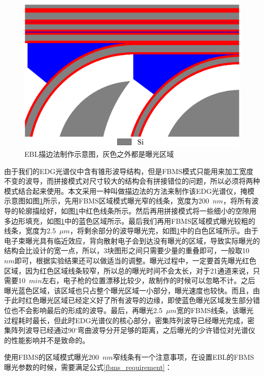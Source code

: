 \begin{figure}[htb]
	\centering
	\includegraphics[width=14cm]{./Pictures/edg_miaobian.jpg}
	\captionsetup{justification=centering}
	\caption{EBL描边法制作示意图，灰色之外都是曝光区域}
	\label{edg_miaobian}
\end{figure}

由于我们的EDG光谱仪中含有锥形波导结构，但是FBMS模式只能用来加工宽度不变的波导，而拼接模式对尺寸较大的结构会有拼接错位的问题，所以必须将两种模式结合起来使用。本文采用一种叫做描边法的方法来制作该EDG光谱仪，掩模示意图如图\ref{edg_miaobian}所示，先用FBMS区域模式曝光窄的线条，宽度为200~$nm$，将所有波导的轮廓描绘好，如图\ref{edg_miaobian}中红色线条所示。然后再用拼接模式将一些细小的空隙用多边形填充，如图\ref{edg_miaobian}中的蓝色区域所示。最后我们再用FBMS区域模式曝光较粗的线条，宽度为2.5~$\mu m$，将剩余部分的波导曝光完，如图\ref{edg_miaobian}中的白色区域所示。由于电子束曝光具有临近效应，背向散射电子会到达没有曝光的区域，导致实际曝光的结构会比设计的宽一点，所以，3块图形之间只需要少量的重叠即可，一般取10~$nm$即可，根据实验结果还可以做适当的调整。曝光过程中，一定要首先曝光红色区域，因为红色区域线条较窄，所以总的曝光时间不会太长，对于21通道来说，只需要10~$min$左右，电子枪的位置漂移比较少，故制作的时候可以忽略不计。之后曝光蓝色区域，该区域也只占整个曝光区域一小部分，曝光速度也较快。而且，由于此时红色曝光区域已经定义好了所有波导的边缘，即使蓝色曝光区域发生部分错位也不会影响最后的形成的波导。最后，再曝光2.5~$\mu m$宽的FBMS线条，该曝光过程耗时最长，但此时EDG光谱仪的核心部分，密集阵列波导已经曝光完成，密集阵列波导已经通过90$^{\circ}$弯曲波导分开足够的距离，之后曝光的少许错位对光谱仪的性能影响并不是致命的。

使用FBMS的区域模式曝光200~$nm$窄线条有一个注意事项，在设置EBL的FBMS曝光参数的时候，需要满足公式\ref{fbms_requirement}：

